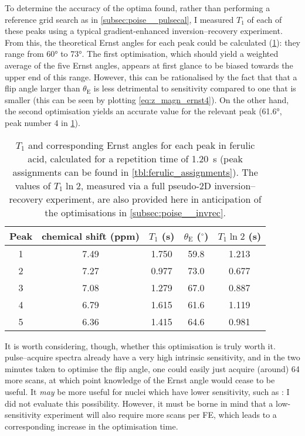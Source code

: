 To determine the accuracy of the optima found, rather than performing a reference grid search as in \cref{subsec:poise__pulsecal}, I measured $T_1$ of each of these peaks using a typical gradient-enhanced inversion--recovery experiment.
From this, the theoretical Ernst angles for each peak could be calculated (\cref{tbl:ernst_invrec}): they range from \ang{60} to \ang{73}.
The first optimisation, which should yield a weighted average of the five Ernst angles, appears at first glance to be biased towards the upper end of this range.
However, this can be rationalised by the fact that that a flip angle larger than $\theta_\text{E}$ is less detrimental to sensitivity compared to one that is smaller (this can be seen by plotting \cref{eq:z_magn_ernst4}).
On the other hand, the second optimisation yields an accurate value for the relevant peak (\ang{61.6}, peak number 4 in \cref{tbl:ernst_invrec}).

\begin{table}[!ht]
    \centering
    \begin{tabular}{ccccc}
        \toprule
        Peak & \proton{} chemical shift (ppm) & $T_1$ (\unit{\s}) & $\theta_\text{E}$ ($^\circ$) & $T_1\ln 2$ (\unit{\s})\\
        \midrule
        1 & 7.49 & 1.750 & 59.8 & 1.213 \\
        2 & 7.27 & 0.977 & 73.0 & 0.677 \\
        3 & 7.08 & 1.279 & 67.0 & 0.887 \\
        4 & 6.79 & 1.615 & 61.6 & 1.119 \\
        5 & 6.36 & 1.415 & 64.6 & 0.981 \\
        \bottomrule
    \end{tabular}
    \caption[$T_1$ values for ferulic acid]{
        $T_1$ and corresponding Ernst angles for each peak in ferulic acid, calculated for a repetition time of \qty{1.20}{\s} (peak assignments can be found in \cref{tbl:ferulic_assignments}).
        The values of $T_1 \ln 2$, measured via a full pseudo-2D inversion--recovery experiment, are also provided here in anticipation of the optimisations in \cref{subsec:poise__invrec}.
    }
    \label{tbl:ernst_invrec}
\end{table}

It is worth considering, though, whether this optimisation is truly worth it.
\proton{} pulse--acquire spectra already have a very high intrinsic sensitivity, and in the two minutes taken to optimise the flip angle, one could easily just acquire (around) 64 more scans, at which point knowledge of the Ernst angle would cease to be useful.
It \textit{may} be more useful for nuclei which have lower sensitivity, such as \carbon{}: I did not evaluate this possibility.
However, it must be borne in mind that a low-sensitivity experiment will also require more scans per FE, which leads to a corresponding increase in the optimisation time.

